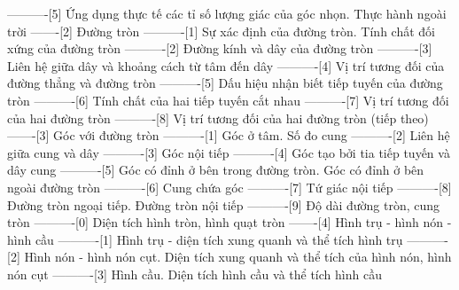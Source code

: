 ----------[5] Ứng dụng thực tế các tỉ số lượng giác của góc nhọn. Thực hành ngoài trời
-------[2] Đường tròn
----------[1] Sự xác định của đường tròn. Tính chất đối xứng của đường tròn
----------[2] Đường kính và dây của đường tròn
----------[3] Liên hệ giữa dây và khoảng cách từ tâm đến dây
----------[4] Vị trí tương đối của đường thẳng và đường tròn
----------[5] Dấu hiệu nhận biết tiếp tuyến của đường tròn
----------[6] Tính chất của hai tiếp tuyến cắt nhau
----------[7] Vị trí tương đối của hai đường tròn
----------[8] Vị trí tương đối của hai đường tròn (tiếp theo)
-------[3] Góc với đường tròn
----------[1] Góc ở tâm. Số đo cung
----------[2] Liên hệ giữa cung và dây
----------[3] Góc nội tiếp
----------[4] Góc tạo bởi tia tiếp tuyến và dây cung
----------[5] Góc có đỉnh ở bên trong đường tròn. Góc có đỉnh ở bên ngoài đường tròn
----------[6] Cung chứa góc
----------[7] Tứ giác nội tiếp
----------[8] Đường tròn ngoại tiếp. Đường tròn nội tiếp
----------[9] Độ dài đường tròn, cung tròn
----------[0] Diện tích hình tròn, hình quạt tròn
-------[4] Hình trụ - hình nón - hình cầu
----------[1] Hình trụ - diện tích xung quanh và thể tích hình trụ
----------[2] Hình nón - hình nón cụt. Diện tích xung quanh và thể tích của hình nón, hình nón cụt
----------[3] Hình cầu. Diện tích hình cầu và thể tích hình cầu
